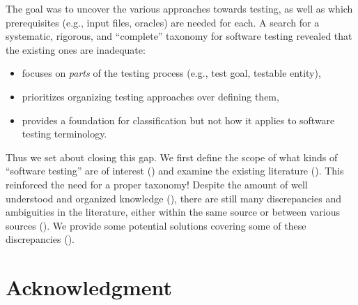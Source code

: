 \documentclass[conference]{IEEEtran}
\begin{document}
The goal was to uncover the various approaches towards testing, as well as
which prerequisites (e.g., input files, oracles) are needed for each.  A search
for a systematic, rigorous, and ``complete'' taxonomy for software testing
revealed that the existing ones are inadequate:

\begin{itemize}
    \item \cite{TebesEtAl2020a} focuses on \emph{parts} of the
          testing process (e.g., test goal, testable entity),
    \item \cite{SouzaEtAl2017} prioritizes organizing testing
          approaches over defining them,
    \item \cite{UnterkalmsteinerEtAl2014} provides a foundation for
          classification but not how it applies to software testing terminology.
\end{itemize}

Thus we set about closing this gap. We first define the scope of what kinds of
``software testing'' are of interest () and examine the existing
literature (). This reinforced the need for a proper taxonomy!
Despite the amount of well understood and organized knowledge (),
there are still many discrepancies and ambiguities in the literature, either
within the same source or between various sources (). We provide
some potential solutions covering some of these discrepancies ().







\section*{Acknowledgment}


\newpage



\end{document}
